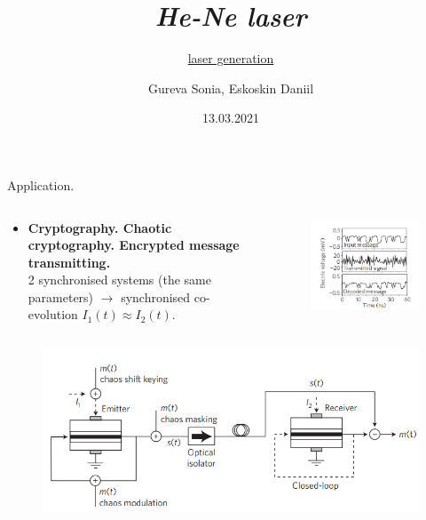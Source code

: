 \documentclass[10pt,pdf,hyperref={unicode}, aspectratio=169]{beamer}
\title{\emph{He-Ne laser}}
\subtitle{\underline{laser generation}}
\date{13.03.2021}
\author{Gureva Sonia, Eskoskin Daniil}
\begin{document}
\begin{frame}
\maketitle
\begin{center}

\end{center}
\end{frame}


\begin{frame}{Application.}
	
\begin{columns}
\begin{column}{0.4\linewidth}
\begin{itemize}
	\item \textbf{Cryptography. Chaotic cryptography. Encrypted message transmitting.}\\
	2 synchronised systems (the same parameters) $\to $ synchronised co-evolution $I_1(t) \approx I_2(t) $.
\end{itemize}
\end{column}		
\begin{column}{0.4\linewidth}
\begin{figure}
\includegraphics[width=\linewidth]{Encryption.png}
\end{figure}
\end{column}			
\end{columns}
\begin{figure}
	\includegraphics[width=0.4\linewidth]{Encryption_sheme.png}
\end{figure}
\end{frame}
\end{document}
